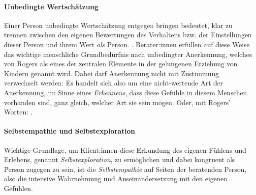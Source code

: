 \documentclass[
  twoside,
  parskip=half-,
  paper=176mm:246mm,
  BCOR=14mm,
  DIV=14,
]{scrreprt}
\begin{document}
\paragraph{Unbedingte Wertschätzung} Einer Person unbedingte Wertschätzung entgegen bringen bedeutet, klar zu trennen zwischen den eigenen Bewertungen des Verhaltens bzw. der Einstellungen dieser Person und ihrem Wert \textit{als} Person. . Berater:innen erfüllen auf diese Weise das wichtige menschliche Grundbedürfnis nach unbedingter Anerkennung, welches von Rogers als eines der zentralen Elemente in der gelungenen Erziehung von Kindern genannt wird. Dabei darf Anerkennung nicht mit Zustimmung verwechselt werden:  Es handelt sich also um eine nicht-wertende Art der Anerkennung, im Sinne eines \textit{Erkennens}, dass diese Gefühle in diesem Menschen vorhanden sind, ganz gleich, welcher Art sie sein mögen. Oder, mit Rogers' Worten: .

\paragraph{Selbstempathie und Selbstexploration} Wichtige Grundlage, um Klient:innen diese Erkundung des eigenen Fühlens und Erlebens, genannt \textit{Selbstexploration}, zu ermöglichen und dabei kongruent als Person zugegen zu sein, ist die \textit{Selbstempathie} auf 
Seiten der beratenden Person, also die intensive Wahrnehmung und Auseinandersetzung mit den eigenen Gefühlen. 
\end{document}
